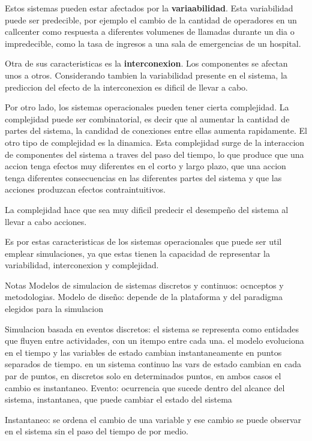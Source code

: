 \documentclass[a4paper]{article}
\begin{document}
Estos sistemas pueden estar afectados por la \textbf{variaabilidad}. Esta 
variabilidad puede ser predecible, por ejemplo el cambio de la cantidad
de operadores en un callcenter como respuesta a diferentes volumenes de 
llamadas durante un dia o impredecible, como la tasa de ingresos a una
sala de emergencias de un hospital.

Otra de sus caracteristicas es la \textbf{interconexion}. Los componentes
se afectan unos a otros. Considerando tambien la variabilidad presente
en el sistema, la prediccion del efecto de la interconexion es dificil
de llevar a cabo.

Por otro lado, los sistemas operacionales pueden tener cierta complejidad.
La complejidad puede ser combinatorial, es decir que al aumentar la
cantidad de partes del sistema, la candidad de conexiones entre ellas
aumenta rapidamente.
El otro tipo de complejidad es la dinamica. Esta complejidad surge de
la interaccion de componentes del sistema a traves del paso del tiempo,
lo que produce que una accion tenga efectos muy diferentes en el corto y
largo plazo, que una accion tenga diferentes consecuencias en las diferentes
partes del sistema y que las acciones produzcan efectos contraintuitivos.

La complejidad hace que sea muy dificil predecir el desempeño del sistema
al llevar a cabo acciones.

Es por estas caracteristicas de los sistemas operacionales que puede ser
util emplear simulaciones, ya que estas tienen la capacidad de representar
la variabilidad, interconexion y complejidad.

Notas Modelos de simulacion de sistemas discretos y continuos: ocnceptos y metodologias.
Modelo de diseño:
depende de la plataforma y del paradigma elegidos para la simulacion

Simulacion basada en eventos discretos:
el sistema se representa como entidades que fluyen entre actividades, con un itempo entre 
cada una.
el modelo evoluciona en el tiempo y las variables de estado cambian instantaneamente en 
puntos separados de tiempo.
en un sistema continuo las vars de estado cambian en cada par de puntos, en discretos solo en
determinados puntos, en ambos casos el cambio es instantaneo.
Evento: ocurrencia que sucede dentro del alcance del sistema, instantanea, que puede 
cambiar el estado del sistema

Instantaneo: se ordena el cambio de una variable y ese cambio se puede observar en el sistema
sin el paso del tiempo de por medio.
\end{document}
